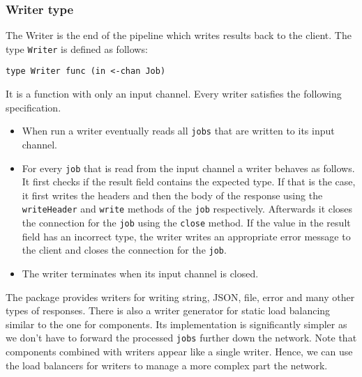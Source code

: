 \subsubsection{Writer type}
The Writer is the end of the pipeline which writes results back to the client.
The type \texttt{Writer} is defined as follows:
\begin{lstlisting}
type Writer func (in <-chan Job)
\end{lstlisting}
It is a function with only an input channel.
Every writer satisfies the following specification.
\begin{itemize}
    \item When run a writer eventually reads all \texttt{jobs} that are written 
          to its input channel.

	\item For every \texttt{job} that is  read from the input channel a writer 
          behaves as follows. It first checks if the result field 
          contains the expected type. If that is the case, it first 
          writes the headers and then the body of the response using 
          the \texttt{writeHeader} and \texttt{write} methods of the \texttt{job} respectively. Afterwards it closes the connection for the \texttt{job} 
          using the \texttt{close} method. If the value in the result 
          field has an incorrect type, the writer writes an appropriate 
          error message to the client and closes the connection for the 
          \texttt{job}. 

	\item The writer terminates when its input channel is closed.
\end{itemize}
The package provides writers for writing string, JSON, file, error and many
other types of responses. There is also a writer generator for static
load balancing similar to the one for components. Its implementation
is significantly simpler as we don't have to forward the processed
\texttt{jobs} further down the network. Note that components
combined with writers appear like a single writer. Hence, we can use the
load balancers for writers to manage a more complex part the network.

